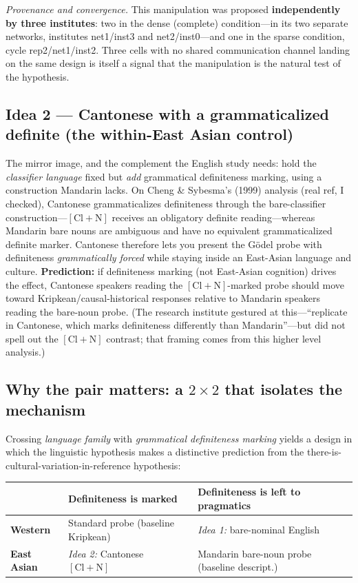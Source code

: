 \documentclass[11pt]{article}
\begin{document}
\emph{Provenance and convergence.} This manipulation was proposed \textbf{independently by three institutes}: two in the dense (complete) condition---in its two separate networks, institutes net1/inst3 and net2/inst0---and one in the sparse condition, cycle rep2/net1/inst2. Three cells with no shared communication channel landing on the same design is itself a signal that the manipulation is the natural test of the hypothesis.

\subsection*{Idea 2 --- Cantonese with a grammaticalized definite (the within-East Asian control)}

The mirror image, and the complement the English study needs: hold the \emph{classifier language} fixed but \emph{add} grammatical definiteness marking, using a construction Mandarin lacks. On Cheng \& Sybesma's (1999) analysis (real ref, I checked), Cantonese grammaticalizes definiteness through the bare-classifier construction---$[\textrm{Cl}+\textrm{N}]$ receives an obligatory definite reading---whereas Mandarin bare nouns are ambiguous and have no equivalent grammaticalized definite marker. Cantonese therefore lets you present the G\"odel probe with definiteness \emph{grammatically forced} while staying inside an East-Asian language and culture. \textbf{Prediction:} if definiteness marking (not East-Asian cognition) drives the effect, Cantonese speakers reading the $[\textrm{Cl}+\textrm{N}]$-marked probe should move toward Kripkean/causal-historical responses relative to Mandarin speakers reading the bare-noun probe. (The research institute gestured at this---``replicate in Cantonese, which marks definiteness differently than Mandarin''---but did not spell out the $[\textrm{Cl}+\textrm{N}]$ contrast; that framing comes from this higher level analysis.)

\subsection*{Why the pair matters: a $2\times2$ that isolates the mechanism}

Crossing \emph{language family} with \emph{grammatical definiteness marking} yields a design in which the linguistic hypothesis makes a distinctive prediction from the there-is-cultural-variation-in-reference hypothesis: 

\begin{center}
\footnotesize
\begin{tabular}{@{}lll@{}}
\toprule
 & \textbf{Definiteness is marked} & \textbf{Definiteness is left to pragmatics} \\
\midrule
\textbf{Western} & Standard probe (baseline Kripkean) & \emph{Idea 1:} bare-nominal English \\
\textbf{East Asian} & \emph{Idea 2:} Cantonese $[\textrm{Cl}{+}\textrm{N}]$ & Mandarin bare-noun probe (baseline descript.) \\
\bottomrule
\end{tabular}
\end{center}
\end{document}
